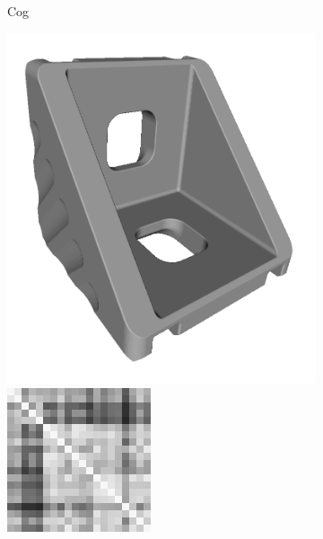 \begin{figure}[ht]
\begin{subfigure}[b]{0.20\linewidth}
		\caption{Cog}
	\end{subfigure}
	\begin{subfigure}[b]{0.23\linewidth}
		\includegraphics[width=\linewidth]{fig/3dreg/bracket.png} \\
		\includegraphics[width=\linewidth]{fig/3dreg/reg3Dtrain_bracket.png} 

\end{subfigure}
\end{figure}
